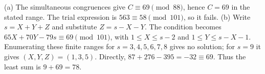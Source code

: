 (a) The simultaneous congruences give $C\equiv69\pmod{88}$, hence $C=69$ in the stated range. The trial expression is $563\equiv58\pmod{101}$, so it fails. (b) Write $s=X+Y+Z$ and substitute $Z=s-X-Y$. The condition becomes $65X+70Y-79s\equiv69\pmod{101}$, with $1\le X\le s-2$ and $1\le Y\le s-X-1$. Enumerating these finite ranges for $s=3,4,5,6,7,8$ gives no solution; for $s=9$ it gives $(X,Y,Z)=(1,3,5)$. Directly, $87+276-395=-32\equiv69$. Thus the least sum is $\boxed{9+69=78}$.
